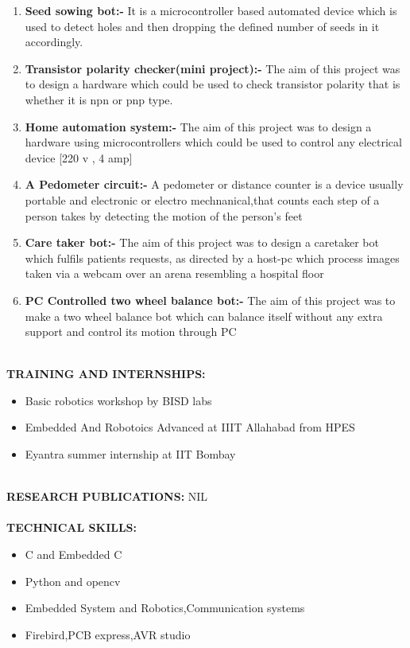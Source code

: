 \documentclass[10pt]{report}
\begin{document}
    \begin{enumerate}
    \item \textbf{Seed sowing bot:-} It is a microcontroller based automated device which is used to detect holes and then dropping the defined number of seeds in it accordingly. 
    \item \textbf{Transistor polarity checker(mini project):-} The aim of this project was to design a hardware which could be used to check transistor polarity that is whether it is npn or pnp type.
    \item \textbf{Home automation system:-} The aim of this project was to design a hardware using microcontrollers which could be used to control any electrical device [220 v , 4 amp]
    \item \textbf{A Pedometer circuit:-} A pedometer or distance counter is a device usually portable and electronic or electro mechnanical,that counts each step of a person takes by detecting the motion of the person’s feet
    \item \textbf{Care taker bot:-} The aim of this project was to design a caretaker bot which fulfils patients requests, as
    directed by a host-pc which process images taken via a webcam over an arena resembling a hospital floor
    \item \textbf{PC Controlled two wheel balance bot:-} The aim of this project was to make a two wheel balance bot which can
    balance itself without any extra support and control its motion through PC
    \end{enumerate}
    \qquad\\
 \textbf{TRAINING AND INTERNSHIPS:} 
    \begin{itemize}
    \item Basic robotics workshop by BISD labs
    \item Embedded And Robotoics Advanced at IIIT Allahabad from HPES
    \item Eyantra summer internship at IIT Bombay
    \end{itemize}
    \quad\\ 
\textbf{RESEARCH PUBLICATIONS:}  
\qquad\qquad NIL    \\ \\
\textbf{TECHNICAL SKILLS:} 
    \begin{itemize}
    \item C and Embedded C
    \item Python and opencv
    \item Embedded System and Robotics,Communication systems
    \item Firebird,PCB express,AVR studio
    \end{itemize}
\end{document}
